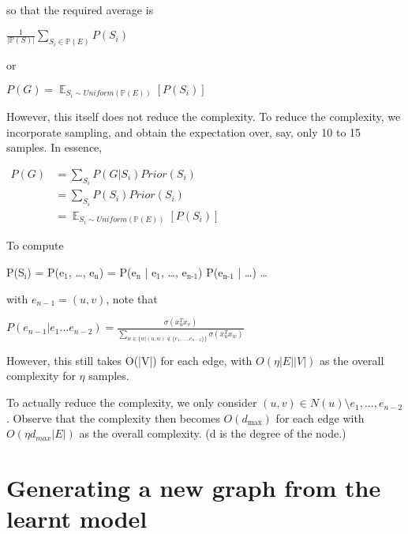 \documentclass{article}
\begin{document}
so that the required average is

\begin{center}
\(\displaystyle \frac {1}{|\mathbb P(S)|} \sum_{S_i \in \mathbb P(E)} {P(S_i)}\)
\end{center}

or

\begin{center}
\(\displaystyle P(G) = \mathop{\mathbb E}_{S_i \sim Uniform(\mathbb P(E))} \left[P(S_i) \right]\)
\end{center}

However, this itself does not reduce the complexity. To reduce the complexity, we incorporate sampling, and obtain the expectation over, say, only 10 to 15 samples. In essence,

\begin{center}
\(\displaystyle
\begin{aligned}
P(G) &= \sum_{S_i} P(G|S_i) Prior(S_i) \\
&= \sum_{S_i} P(S_i) Prior(S_i) \\
&= \mathop{\mathbb E}_{S_i \sim Uniform(\mathbb P(E))} \left[ P(S_i) \right]
\end{aligned}\)
\end{center}

To compute

\begin{center}
P(S\(_{\text{i}}\)) = P(e\(_{\text{1}}\), \ldots{}, e\(_{\text{n}}\)) = P(e\(_{\text{n}}\) | e\(_{\text{1}}\), \ldots{}, e\(_{\text{n-1}}\)) P(e\(_{\text{n-1}}\) | \ldots{}) \ldots{}
\end{center}

with \(e_{n-1} = (u, v)\), note that

\begin{center}
\(\displaystyle P(e_{n-1} | e_1 ... e_{n-2}) = \frac {\sigma(x_u^T x_v)} {\sum_{w \in \{w | (u,w) \notin \{e_1, ..., e_{n-2}\}\}} \sigma(x_u^T x_w)}\)
\end{center}

However, this still takes O(|V|) for each edge, with \(O(\eta|E||V|)\) as the overall complexity for \(\eta\) samples.

To actually reduce the complexity, we only consider \((u,v) \in N(u) \setminus {e_1,...,e_{n-2}}\). Observe that the complexity then becomes \(O(d_{\text{max}})\) for each edge with \(O(\eta d_{max} |E|)\) as the overall complexity. (d is the degree of the node.)

\section{Generating a new graph from the learnt model}
\label{sec:org3b319fb}
\end{document}
